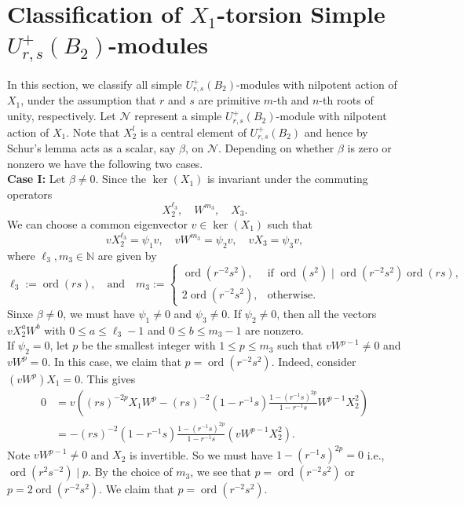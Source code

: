 \documentclass[12 pt,reqno]{amsart}
\numberwithin{equation}{section}
\DeclareMathOperator{\ord}{ord}
\theoremstyle{definition}
\theoremstyle{definition}
\theoremstyle{remark}
\theoremstyle{remark}
\begin{document}
 \section{\texorpdfstring{Classification of $X_1$-torsion Simple $U_{r,s}^{+}(B_2)$-modules}{}}
 In this section, we classify all simple $U_{r,s}^{+}(B_2)$-modules with nilpotent action of $X_1$, under the assumption that $r$ and $s$ are primitive $m$-th and $n$-th roots of unity, respectively. Let $\mathcal{N}$ represent a simple $U_{r,s}^{+}(B_2)$-module with nilpotent action of $X_1$. Note that $X_2^l$ is a central element of $U_{r,s}^{+}(B_2)$ and hence by Schur's lemma acts as a scalar, say $\beta$, on $\mathcal{N}$. Depending on whether $\beta$ is zero or nonzero we have the following two cases.\\
 \textbf{Case I:} Let $\beta \neq 0$. Since the $\ker(X_1)$ is invariant under the commuting operators 
 \[X_2^{\ell_3}, \quad W^{m_3}, \quad X_3.\] We can choose a common eigenvector $v \in \ker(X_1)$ such that 
 \[vX_2^{\ell_3}=\psi_1v, \quad vW^{m_3}=\psi_2v, \quad vX_3=\psi_3v,\] where $ \ell_3, m_3 \in \mathbb{N} $ are given by  
$$
  \ell_3 := \ord(rs), \quad \text{and}\quad   m_3 := 
    \begin{cases}
        \ord(r^{-2}s^2), & \text{if } \ord(s^2) \mid \ord(r^{-2}s^2) \ord(rs) , \\[5pt]
        2\ord(r^{-2}s^2), & \text{otherwise}.
    \end{cases}
$$ Sinxe $\beta \neq 0$, we must have $\psi_1 \neq 0$ and $\psi_3 \neq 0$. 
 If $\psi_2 \neq 0$, then all the vectors $vX_2^{a}{W}^{b}$ with $0 \leq a \leq \ell_3-1$ and $0 \leq b \leq m_3-1$ are nonzero.\\
If $\psi_2=0$, let $p$ be the smallest integer with $1 \leq p \leq m_3$ such that $v{W}^{p-1}\neq 0$ and $v{W}^p=0$. In this case, we claim that $p=\ord(r^{-2}s^{2})$. Indeed, consider $\left(v{W}^p\right)X_1=0.$ This gives 
\begin{align*}
   0&=v\left((rs)^{-2p}X_1{W}^p-(rs)^{-2}(1-r^{-1}s)\displaystyle\frac{1-(r^{-1}s)^{2p}}{1-r^{-1}s}{W}^{p-1}X_2^{2}\right)\\
   &=-(rs)^{-2}(1-r^{-1}s)\displaystyle\frac{1-(r^{-1}s)^{2p}}{1-r^{-1}s}\left(v{W}^{p-1}X_2^{2}\right). 
\end{align*}
Note $vW^{p-1}\neq 0$ and $X_2$ is invertible. So we must have $1-(r^{-1}s)^{2p}=0$ i.e., $\ord(r^2s^{-2})\mid p$. By the choice of $m_3$, we see that $p=\ord(r^{-2}s^2)$ or $p=2\ord(r^{-2}s^2)$. We claim that $p=\ord(r^{-2}s^2)$.
\end{document}
